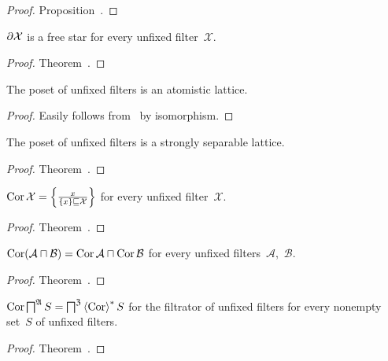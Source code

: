 \begin{proof}
Proposition~.
\end{proof}

\begin{prop}
$\partial\mathcal{X}$ is a free star for every unfixed
filter~$\mathcal{X}$.
\end{prop}

\begin{proof}
Theorem~.
\end{proof}

\begin{prop}
The poset of unfixed filters is an atomistic lattice.
\end{prop}

\begin{proof}
Easily follows from~ by isomorphism.
\end{proof}

\begin{prop}
The poset of unfixed filters is a strongly separable lattice.
\end{prop}

\begin{proof}
Theorem~.
\end{proof}

\begin{prop}
$\operatorname{Cor}\mathcal{X}=\left\{ \frac{x}{\{x\}\sqsubseteq\mathcal{X}}\right\}$
for every unfixed filter~$\mathcal{X}$.
\end{prop}

\begin{proof}
Theorem~.
\end{proof}

\begin{prop}
$\operatorname{Cor}(\mathcal{A}\sqcap\mathcal{B})=
\operatorname{Cor}\mathcal{A}\sqcap\operatorname{Cor}\mathcal{B}$ for every unfixed
filters~$\mathcal{A}$,~$\mathcal{B}$.
\end{prop}

\begin{proof}
Theorem~.
\end{proof}

\begin{prop}
$\operatorname{Cor}\bigsqcap^{\mathfrak{A}}S=\bigsqcap^{\mathfrak{Z}}\left\langle \operatorname{Cor}\right\rangle ^{\ast}S$ for the filtrator of unfixed filters for
every nonempty set~$S$ of unfixed filters.
\end{prop}

\begin{proof}
Theorem~.
\end{proof}

